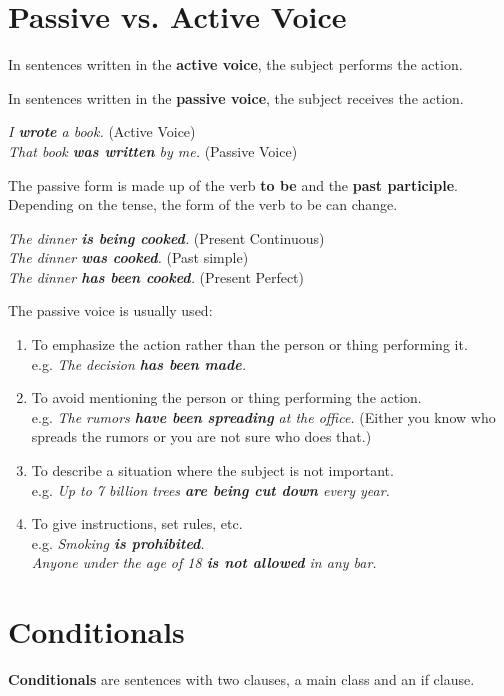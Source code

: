 \documentclass[hidelinks,10pt,a4paper]{article}
\begin{document}
\section{Passive vs. Active Voice}
In sentences written in the \textbf{active voice}, the subject performs the action.

In sentences written in the \textbf{passive voice}, the subject receives the action.

\begin{center}
	\textit{I \textbf{wrote} a book.} (Active Voice) \\
	\textit{That book \textbf{was written} by me.} (Passive Voice)
\end{center}

The passive form is made up of the verb \textbf{to be} and the \textbf{past participle}. Depending on the tense, the form of the verb to be can change.

\begin{center}
	\textit{The dinner \textbf{is being cooked}.} (Present Continuous)\\
	\textit{The dinner \textbf{was cooked}.} (Past simple)\\
	\textit{The dinner \textbf{has been cooked}.} (Present Perfect)
\end{center}

The passive voice is usually used:
\begin{enumerate}[label=(\alph*)]
	\item To emphasize the action rather than the person or thing performing it. \\
		e.g. \textit{The decision \textbf{has been made}.}
	\item To avoid mentioning the person or thing performing the action. \\
		e.g. \textit{The rumors \textbf{have been spreading} at the office.} (Either you know who spreads the rumors or you are not sure who does that.)
	\item To describe a situation where the subject is not important. \\
		e.g. \textit{Up to 7 billion trees \textbf{are being cut down} every year.}
	\item To give instructions, set rules, etc. \\
		e.g. \textit{Smoking \textbf{is prohibited}.\\
		Anyone under the age of 18 \textbf{is not allowed} in any bar.}
\end{enumerate}

\section{Conditionals}
\textbf{Conditionals} are sentences with two clauses, a main class and an if clause.
\end{document}
